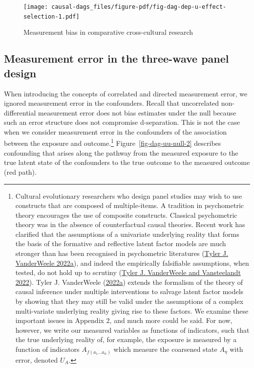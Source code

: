 \documentclass[
  singlecolumn]{report}
\begin{document}
\begin{figure}

{\centering \texttt{[image: causal-dags\_files/figure-pdf/fig-dag-dep-u-effect-selection-1.pdf]}

}

\caption{\label{fig-dag-dep-u-effect-selection}Measurement bias in
comparative cross-cultural research}

\end{figure}

\hypertarget{measurement-error-in-the-three-wave-panel-design}{%
\subsection{Measurement error in the three-wave panel
design}\label{measurement-error-in-the-three-wave-panel-design}}

When introducing the concepts of correlated and directed measurement
error, we ignored measurement error in the confounders. Recall that
uncorrelated non-differential measurement error does not bias estimates
under the null because such an error structure does not compromise
d-separation. This is not the case when we consider measurement error in
the confounders of the association between the exposure and
outcome.\footnote{Cultural evolutionary researchers who design panel
  studies may wish to use constructs that are composed of
  multiple-items. A tradition in psychometric theory encourages the use
  of composite constructs. Classical psychometric theory was in the
  absence of counterfactual causal theories. Recent work has clarified
  that the assumptions of a univariate underlying reality that forms the
  basis of the formative and reflective latent factor models are much
  stronger than has been recognised in psychometric literatures
  (\protect\hyperlink{ref-vanderweele2022a}{Tyler J. VanderWeele
  2022a}), and indeed the empirically falsifiable assumptions, when
  tested, do not hold up to scrutiny
  (\protect\hyperlink{ref-vanderweele2022b}{Tyler J. VanderWeele and
  Vansteelandt 2022}). Tyler J. VanderWeele
  (\protect\hyperlink{ref-vanderweele2022a}{2022a}) extends the
  formalism of the theory of causal inference under multiple
  interventions to salvage latent factor models by showing that they may
  still be valid under the assumptions of a complex multi-variate
  underlying reality giving rise to these factors. We examine these
  important issues in Appendix 2, and much more could be said. For now,
  however, we write our measured variables as functions of indicators,
  such that the true underlying reality of, for example, the exposure is
  measured by a function of indicators \(A_{f(a_1\dots a_n)}^{}\) which
  measure the coarsened state \(A_\eta\) with error, denoted \(U_A\).}
Figure~\ref{fig-dag-uu-null-2} describes confounding that arises along
the pathway from the measured exposure to the true latent state of the
confounders to the true outcome to the measured outcome (red path).
\end{document}
